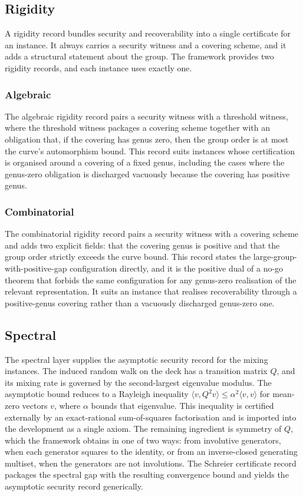 \documentclass[a4paper,11pt]{article}
\begin{document}
\subsection{Rigidity}

A rigidity record bundles security and recoverability into a single certificate
for an instance. It always carries a security witness and a covering scheme, and
it adds a structural statement about the group. The framework provides two
rigidity records, and each instance uses exactly one.

\subsubsection{Algebraic}

The algebraic rigidity record pairs a security witness with a threshold witness,
where the threshold witness packages a covering scheme together with an
obligation that, if the covering has genus zero, then the group order is at most
the curve's automorphism bound. This record suits instances whose certification
is organised around a covering of a fixed genus, including the cases where the
genus-zero obligation is discharged vacuously because the covering has positive
genus.

\subsubsection{Combinatorial}

The combinatorial rigidity record pairs a security witness with a covering scheme
and adds two explicit fields: that the covering genus is positive and that the
group order strictly exceeds the curve bound. This record states the
large-group-with-positive-gap configuration directly, and it is the positive
dual of a no-go theorem that forbids the same configuration for any genus-zero
realisation of the relevant representation. It suits an instance that realises
recoverability through a positive-genus covering rather than a vacuously
discharged genus-zero one.

\subsection{Spectral}

The spectral layer supplies the asymptotic security record for the mixing
instances. The induced random walk on the deck has a transition matrix $Q$, and
its mixing rate is governed by the second-largest eigenvalue modulus. The
asymptotic bound reduces to a Rayleigh inequality $\langle v, Q^2 v\rangle \le
\alpha^2 \langle v, v\rangle$ for mean-zero vectors $v$, where $\alpha$ bounds
that eigenvalue. This inequality is certified externally by an exact-rational
sum-of-squares factorisation and is imported into the development as a single
axiom. The remaining ingredient is symmetry of $Q$, which the framework obtains
in one of two ways: from involutive generators, when each generator squares to
the identity, or from an inverse-closed generating multiset, when the generators
are not involutions. The Schreier certificate record packages the spectral gap
with the resulting convergence bound and yields the asymptotic security record
generically.
\end{document}
